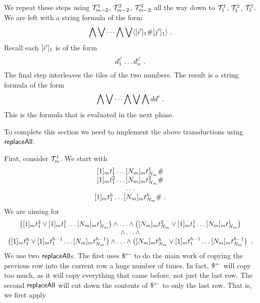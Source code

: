 We repeat these steps using $\psst^1_{\expheight-2}$,
$\psst^2_{\expheight-2}$, $\psst^3_{\expheight-2}$ all the way down to
$\psst^1_1$, $\psst^2_1$, $\psst^3_1$. We are left with a string formula of the
form
\[
    \bigwedge \bigvee \cdots \bigwedge \bigvee \lmark
        \tenc{1}{\idxi'} \spacer \tenc{1}{\idxj'}
    \rmark \ .
\]
Recall each $\tenc{1}{\idxi'}$ is of the form
\[
    \vartile^{\idxi'}_1 \ldots \vartile^{\idxi'}_\linlen \ .
\]
The final step interleaves the tiles of the two numbers. The result is a string
formula of the form
\[
    \bigwedge \bigvee \cdots \bigwedge \bigvee \bigwedge \vartile \vartile' \ .
\]
This is the formula that is evaluated in the next phase.

To complete this section we need to implement the above transductions using
$\replaceall$.

First, consider $\psst^1_\expheight$.  We start with
\[
    \begin{array}{c}
        \fullrow{1} \spacer \\
        \fullrow{2} \spacer \\
        \ldots \\
        \fullrow{\tileheight} \spacer \ .
    \end{array}
\]
We are aiming for
\[
    \begin{array}{c}
        \brac{
            \tenc{\expheight}{1} \tile^2_1
                \lor
                \fullrow{1}
        }
        \land
        \ldots
        \land
        \brac{
            \tenc{\expheight}{\nmax{\expheight}} \tile^2_{\nmax{\expheight}}
                \lor
                \fullrow{1}
        } \\
        \land \ldots \land \\
        \brac{
            \tenc{\expheight}{1} \tile^\tileheight_1
                \lor
                \fullrow{\tileheight-1}
        }
        \land
        \ldots
        \land
        \brac{
            \tenc{\expheight}{\nmax{\expheight}}
                \tile^\tileheight_{\nmax{\expheight}}
                \lor
                \fullrow{\tileheight-1}
        } \ .\\
    \end{array}
\]
We use two $\replaceall$s. The first uses $\refbefore$ to do the main work of
copying the previous row into the current row a huge number of times. In fact,
$\refbefore$ will copy too much, as it will copy everything that came before,
not just the last row. The second $\replaceall$ will cut down the contents of
$\refbefore$ to only the last row. That is, we first apply
